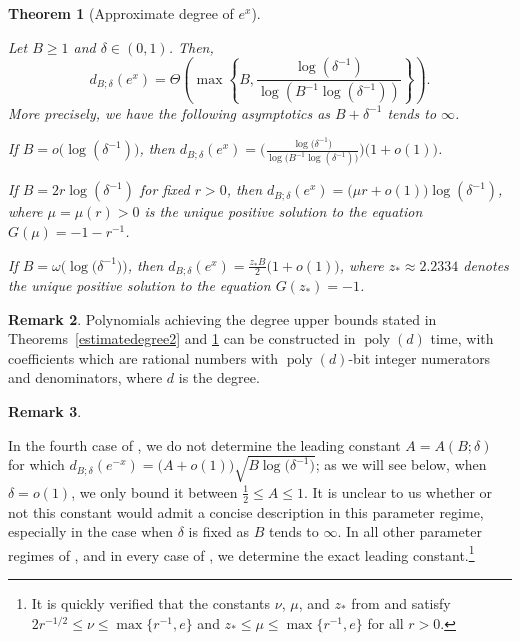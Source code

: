 \documentclass[10pt,a4paper]{article}
\newcommand{\poly}{\mathop{\mathrm{poly}}}
\theoremstyle{plain}\newtheorem{theorem}{Theorem}
\theoremstyle{definition}
\newtheorem{remark}[theorem]{Remark}
\begin{document}
\begin{theorem}[Approximate degree of $e^{x}$] 

\label{estimatedegree1}

Let $B \ge 1$ and $\delta \in (0, 1)$. Then,
$$d_{B; \delta} (e^{x}) = \Theta\left( \max \left\{ B, \frac{\log(\delta^{-1}) }{ \log(B^{-1} \log(\delta^{-1}))} \right\}\right).$$ More precisely, we have the following asymptotics as $B + \delta^{-1}$ tends to $\infty$.

\begin{enumerate}


{\item If $B = o \big( \log ( \delta^{-1}) \big)$, then $d_{B; \delta} (e^x)  =  \bigg( \displaystyle\frac{\log \big( \delta^{-1} \big)}{\log \big( B^{-1} \log (\delta^{-1}) \big)} \bigg) \big( 1 + o (1) \big)$.}

{\item If $B = 2 r \log ( \delta^{-1})$ for fixed $r > 0$, then $d_{B; \delta} (e^x) = \big( \mu r + o(1) \big) \log (\delta^{-1})$, where $\mu = \mu (r) > 0$ is the unique positive solution to the equation $G (\mu) = -1 - r^{-1}$.}


{\item If $B = \omega \big( \log \big( \delta^{-1}) \big)$, then $d_{B; \delta} (e^x)  = \displaystyle\frac{z_*B}{2} \big( 1 + o(1) \big)$, where $z_* \approx 2.2334$ denotes the unique positive solution to the equation $G (z_*) = -1$.}

\end{enumerate}

\end{theorem} 





\begin{remark}
Polynomials achieving the degree upper bounds stated in Theorems~\ref{estimatedegree2} and \ref{estimatedegree1} can be constructed in $\poly(d)$ time, with coefficients which are rational numbers with $\poly(d)$-bit integer numerators and denominators, where $d$ is the degree.
\end{remark}

\begin{remark} \label{rem6}

In the fourth case of , we do not determine the leading constant $A = A(B; \delta)$ for which $d_{B; \delta} (e^{-x}) = \big( A + o(1) \big) \sqrt{B \log \big( \delta^{-1} \big)}$; as we will see below, when $\delta = o(1)$, we only bound it between $\frac{1}{2} \leq A \leq 1$. It is unclear to us whether or not this constant would admit a concise description in this parameter regime, especially in the case when $\delta$ is fixed as $B$ tends to $\infty$. 
In all other parameter regimes of , and in every case of , we determine the exact leading constant.\footnote{It is quickly verified that the constants $\nu$, $\mu$, and $z_*$ from  and  satisfy $2r^{-1/2} \le \nu \le \max \big\{ r^{-1}, e \big\}$ and $z_* \le \mu \le \max \big\{ r^{-1}, e \big\}$ for all $r>0$.}

\end{remark} 
\end{document}
